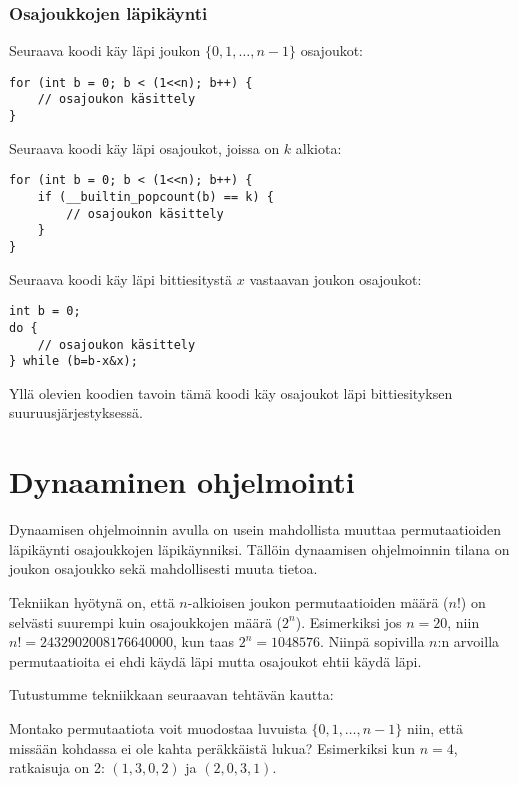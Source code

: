 \subsubsection{Osajoukkojen läpikäynti}

Seuraava koodi käy läpi joukon $\{0,1,\ldots,n-1\}$ osajoukot:

\begin{lstlisting}
for (int b = 0; b < (1<<n); b++) {
    // osajoukon käsittely
}
\end{lstlisting}

\noindent
Seuraava koodi käy läpi
osajoukot, joissa on $k$ alkiota:

\begin{lstlisting}
for (int b = 0; b < (1<<n); b++) {
    if (__builtin_popcount(b) == k) {
        // osajoukon käsittely
    }
}
\end{lstlisting}

\noindent
Seuraava koodi käy läpi bittiesitystä
$x$ vastaavan joukon osajoukot:
\begin{lstlisting}
int b = 0;
do {
    // osajoukon käsittely
} while (b=b-x&x);
\end{lstlisting}

Yllä olevien koodien tavoin tämä koodi käy osajoukot
läpi bittiesityksen suuruusjärjestyksessä.

\section{Dynaaminen ohjelmointi}

Dynaamisen ohjelmoinnin avulla on usein mahdollista
muuttaa permutaatioiden läpikäynti osajoukkojen läpikäynniksi.
Tällöin dynaamisen ohjelmoinnin tilana on
joukon osajoukko sekä mahdollisesti muuta tietoa.

Tekniikan hyötynä on,
että $n$-alkioisen joukon permutaatioiden määrä ($n!$)
on selvästi suurempi kuin osajoukkojen määrä ($2^n$).
Esimerkiksi jos $n=20$, niin $n!=2432902008176640000$,
kun taas $2^n=1048576$.
Niinpä sopivilla $n$:n arvoilla permutaatioita ei ehdi
käydä läpi mutta osajoukot ehtii käydä läpi.

Tutustumme tekniikkaan seuraavan tehtävän kautta:

\begin{task}
Montako permutaatiota voit muodostaa
luvuista $\{ 0,1,\ldots,n-1 \}$ niin,
että missään kohdassa ei ole kahta peräkkäistä lukua?
Esimerkiksi kun $n=4$, ratkaisuja on 2: $(1,3,0,2)$
ja $(2,0,3,1)$.
\end{task}

